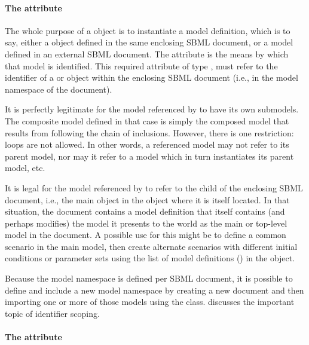 \paragraph{The \fixttspace{} attribute}
\label{submodel-modelref}
  
The whole purpose of a \Submodel object is to instantiate a model definition, which is to say, either a \Model object defined in the same enclosing SBML document, or a model defined in an external SBML document.  The  attribute is the means by which that model is identified.  This required attribute of type , must refer to the identifier of a \Model or \ExternalModelDefinition object within the enclosing SBML document (i.e., in the model namespace of the document).

It is perfectly legitimate for the model referenced by  to have its own submodels.  The composite model defined in that case is simply the composed model that results from following the chain of inclusions.  However, there is one restriction: loops are not allowed. In other words, a referenced model may not refer to its parent model, nor may it refer to a model which in turn instantiates its parent model, etc.

It is legal for the model referenced by  to refer to the  child of the enclosing SBML document, i.e., the main \Model object in the \SBML object where it is itself located.  In that situation, the document contains a model definition that itself contains (and perhaps modifies) the model it presents to the world as the main or top-level model in the document.  A possible use for this might be to define a common scenario in the main model, then create alternate scenarios with different initial conditions or parameter sets using the list of model definitions () in the \SBML object.

Because the model namespace is defined per SBML document, it is possible to define and include a new model namespace by creating a new document and then importing one or more of those models using the \ExternalModelDefinition class.   discusses the important topic of identifier scoping.


\paragraph{The \fixttspace{} attribute}
\label{submodel-timeconversionfactor}

